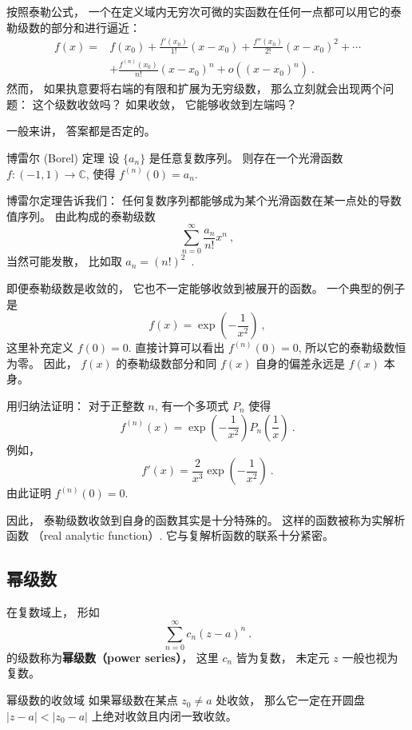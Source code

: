 

按照泰勒公式， 一个在定义域内无穷次可微的实函数在任何一点都可以用它的泰勒级数的部分和进行逼近：
$$
\begin{aligned}
f(x)=&f(x_0)+\frac{f'(x_0)}{1!}(x-x_0)+\frac{f''(x_0)}{2!}(x-x_0)^2+\cdots\\
&+\frac{f^{(n)}(x_0)}{n!}(x-x_0)^n+o((x-x_0)^n)~.
\end{aligned}
$$
然而， 如果执意要将右端的有限和扩展为无穷级数， 那么立刻就会出现两个问题： 这个级数收敛吗？ 如果收敛， 它能够收敛到左端吗？

一般来讲， 答案都是否定的。 

\begin{theorem}{博雷尔 (Borel) 定理}
设 $\{a_n\}$ 是任意复数序列。 则存在一个光滑函数 $f:(-1,1)\to\mathbb{C}$, 使得 $f^{(n)}(0)=a_n$.
\end{theorem}
博雷尔定理告诉我们： 任何复数序列都能够成为某个光滑函数在某一点处的导数值序列。 由此构成的泰勒级数
$$
\sum_{n=0}^\infty\frac{a_n}{n!}x^n~,
$$
当然可能发散， 比如取 $a_n=(n!)^2$~.

即便泰勒级数是收敛的， 它也不一定能够收敛到被展开的函数。 一个典型的例子是
$$
f(x)=\exp\left(-\frac{1}{x^2}\right)~,
$$
这里补充定义 $f(0)=0$. 直接计算可以看出 $f^{(n)}(0)=0$, 所以它的泰勒级数恒为零。 因此， $f(x)$ 的泰勒级数部分和同 $f(x)$ 自身的偏差永远是 $f(x)$ 本身。

\begin{exercise}{}
用归纳法证明： 对于正整数 $n$, 有一个多项式 $P_n$ 使得
$$
f^{(n)}(x)=\exp\left(-\frac{1}{x^2}\right)P_n\left(\frac{1}{x}\right)~.
$$
例如， 
$$
f'(x)=\frac{2}{x^3}\exp\left(-\frac{1}{x^2}\right)~.
$$
由此证明 $f^{(n)}(0)=0$.
\end{exercise}

因此， 泰勒级数收敛到自身的函数其实是十分特殊的。 这样的函数被称为实解析函数 （real analytic function）. 它与复解析函数的联系十分紧密。

\subsection{幂级数}
在复数域上， 形如
\begin{equation}
\sum_{n=0}^\infty c_n(z-a)^n~.
\end{equation}
的级数称为\textbf{幂级数（power series）}， 这里 $c_n$ 皆为复数， 未定元 $z$ 一般也视为复数。 

\begin{theorem}{幂级数的收敛域}
如果幂级数在某点 $z_0\neq a$ 处收敛， 那么它一定在开圆盘 $|z-a|<|z_0-a|$ 上绝对收敛且内闭一致收敛。
\end{theorem}

